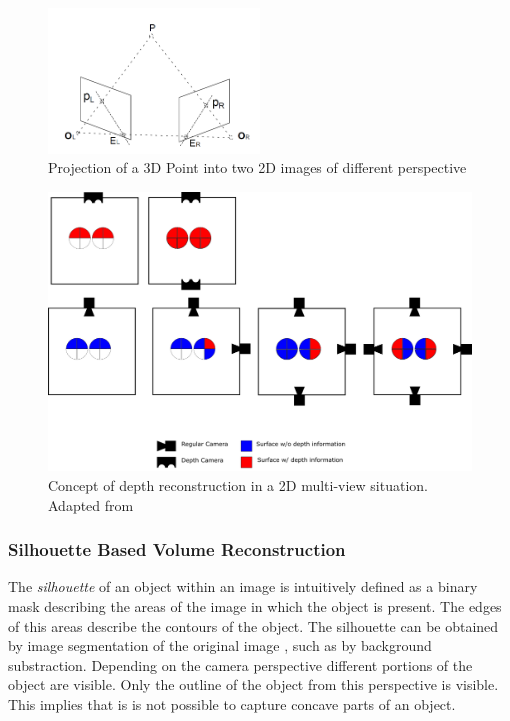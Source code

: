 \begin{figure}[hbt]
	\centering
	\includegraphics[width=0.5\textwidth, keepaspectratio]{resources/Epipolar_Geometry}
	\caption[]{\label{fig:sota:epipolar} Projection of a 3D Point into two 2D images of different perspective}
\end{figure}

\begin{figure}[hbt]
	\centering
	\includegraphics[width=1.0\textwidth, keepaspectratio]{resources/multiview}
	\caption[Concept of depth reconstruction in a 2D multi-view situation]{\label{fig:sota:mulitviewtop}Concept of depth reconstruction in a 2D multi-view situation.
	Adapted from \textcite[][]{sonaten2011volume}}
\end{figure}



\subsubsection{Silhouette Based Volume Reconstruction}

The \emph{silhouette} of an object within an image is intuitively defined 
as a binary mask describing the areas of the image in which the object is present. 
The edges of this areas describe the contours of the object.
The silhouette can be obtained by image segmentation of the original image \autocite[][Chap.~2]{zhang2017imageanalysis}, such as by background substraction.
Depending on the camera perspective different portions of the object are visible.
Only the outline of the object from this perspective is visible.
This implies that is is not possible to capture concave parts of an object.

